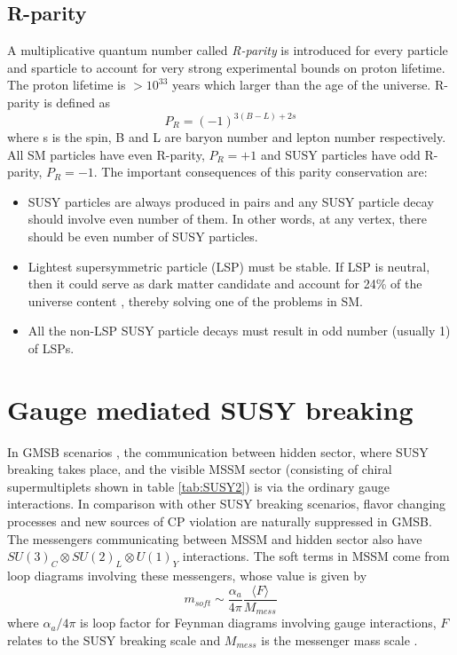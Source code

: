 \subsection{R-parity}
A multiplicative quantum number called \textit{R-parity} is introduced for every particle and sparticle to account for very strong experimental bounds on proton lifetime. The proton lifetime is $>10^{33}$ years \cite{PhysRevLett.102.141801} which larger than the age of the universe. R-parity is defined as
\begin{equation}
\label{eqn:rparity}
P_R = (-1)^{3(B-L)+2s}
\end{equation}
where s is the spin, B and L are baryon number and lepton number respectively. All SM particles have even R-parity, $P_R=+1$ and SUSY particles have odd R-parity, $P_R=-1$. The important consequences of this parity conservation are:
\begin{itemize}
\item SUSY particles are always produced in pairs and any SUSY particle decay should involve even number of them. In other words, at any vertex, there should be even number of SUSY particles.
\item Lightest supersymmetric particle (LSP) must be stable. If LSP is neutral, then it could serve as dark matter candidate and account for 24\% of the universe content \cite{ELLIS1984453}, thereby solving one of the problems in SM.
\item All the non-LSP SUSY particle decays must result in odd number (usually 1) of LSPs.
\end{itemize}

\section{Gauge mediated SUSY breaking}
\label{sec:gmsb}
In GMSB scenarios \cite{Dine:1993yw,Dine:1994vc,Dine:1995ag,Meade:2008wd,Giudice:1998bp,Grajek:2013ola}, the communication between hidden sector, where SUSY breaking takes place, and the visible MSSM sector (consisting of chiral supermultiplets shown in table \ref{tab:SUSY2}) is via the ordinary gauge interactions. In comparison with other SUSY breaking scenarios, flavor changing processes and new sources of CP violation are naturally suppressed \cite{Dine:1993yw} in GMSB. The messengers communicating between MSSM and hidden sector also have $SU(3)_C \otimes SU(2)_L \otimes U(1)_Y$ interactions. The soft terms in MSSM come from loop diagrams involving these messengers, whose value is given by
\begin{equation}
m_{soft} \sim \frac{\alpha_{a}}{4\pi} \frac{\langle F \rangle}{M_{mess}}
\end{equation}
where $\alpha_{a}/{4\pi}$ is loop factor for Feynman diagrams involving gauge interactions, $F$ relates to the SUSY breaking scale and $M_{mess}$ is the messenger mass scale \cite{Martin:1997ns}.

